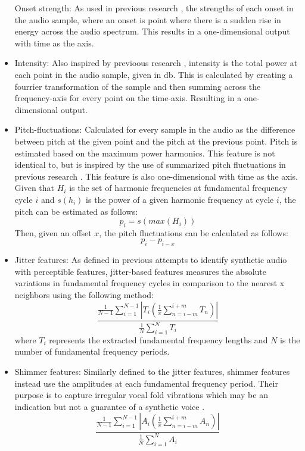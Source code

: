 \documentclass{article}
\begin{document}
\begin{itemize}
					Onset strength: As used in previous research \cite{li_comparative_2022}, the
					strengths of each onset in the audio sample, where an onset is point where
					there is a sudden rise in energy across the audio spectrum. This results in a
					one-dimensional output with time as the axis.
				\item
					Intensity: Also inspired by previoous research \cite{li_comparative_2022},
					intensity is the total power at each point in the audio sample, given in db.
					This is calculated by creating a fourrier transformation of the sample and then
					summing across the frequency-axis for every point on the time-axis. Resulting
					in a one-dimensional output.
				\item
					Pitch-fluctuations: Calculated for every sample in the audio as the difference
					between pitch at the given point and the pitch at the previous point. Pitch is
					estimated based on the maximum power harmonics. This feature is not identical
					to, but is inspired by the use of summarized pitch fluctuations in previous
					research \cite{khanjani_learning_2023}. This feature is also one-dimensional
					with time as the axis. Given that \(H_{i}\) is the set of harmonic frequencies
					at fundamental frequency cycle \(i\) and \(s(h_{i})\) is the power of a given
					harmonic frequency at cycle \(i\), the pitch can be estimated as follows:
					\[p_{i} = s(max(H_{i}))\]
					Then, given an offset \(x\), the pitch fluctuations can be calculated as
					follows:
					\[p_{i}-p_{i-x}\]
				\item
					Jitter features: As defined in previous attempts to identify synthetic audio
					\cite{chaiwongyen_deepfake-speech_2023} with perceptible features,
					jitter-based features measures the absolute variations in fundamental
					frequency cycles in comparison to the nearest x neighbors using the following
					method:
					\[ \frac{ \frac{1}{N-1}\sum_{i=1}^{N-1}|T_{i}(\frac{1}{x}\sum_{n=i-m}^{i+m}T_{n})|}
					{\frac{1}{N}\sum_{i=1}^{N}T_{i}} \]
					where \(T_{i}\) represents the extracted fundamental frequency lengths and
					\(N\) is the number of fundamental frequency periods.
				\item
					Shimmer features: Similarly defined to the jitter features, shimmer features
					instead use the amplitudes at each fundamental frequency period. Their purpose
					is to capture irregular vocal fold vibrations which may be an indication but
					not a guarantee of a synthetic voice \cite{chaiwongyen_deepfake-speech_2023}.
					\[ \frac{ \frac{1}{N-1}\sum_{i=1}^{N-1}|A_{i}(\frac{1}{x}\sum_{n=i-m}^{i+m}A_{n})|}
					{\frac{1}{N}\sum_{i=1}^{N}A_{i}} \]
			\end{itemize}
\end{document}
